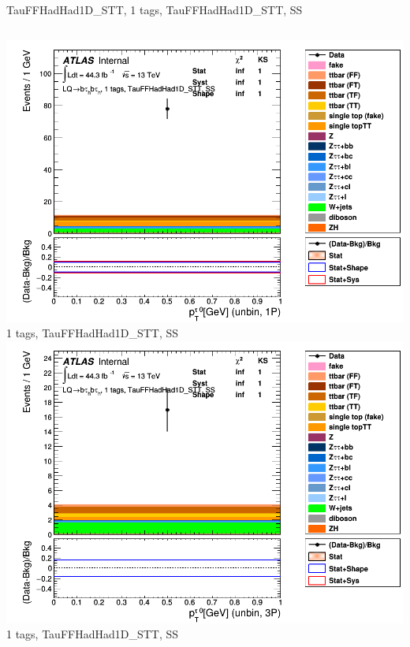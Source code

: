 \begin{frame}{TauFFHadHad1D\_STT, 1 tags, TauFFHadHad1D\_STT, SS}
\begin{columns}[c]
    \centering\includegraphics[width=\textwidth]{C_1tag2pjet_0ptv_SS_UnbinLeadTau1P}\\
    1 tags, TauFFHadHad1D\_STT, SS
    \centering\includegraphics[width=\textwidth]{C_1tag2pjet_0ptv_SS_UnbinLeadTau3P}\\
    1 tags, TauFFHadHad1D\_STT, SS
  \end{columns}
\end{frame}

